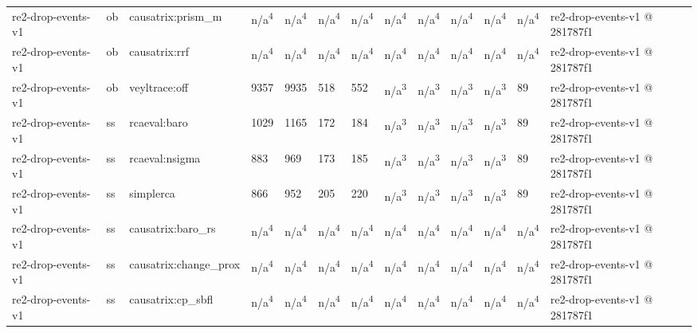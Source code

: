 \begin{table}[t]
\begin{tabular}{lllllllllllll}
re2-drop-events-v1 & ob & causatrix:prism\_m & n/a\textsuperscript{4} & n/a\textsuperscript{4} & n/a\textsuperscript{4} & n/a\textsuperscript{4} & n/a\textsuperscript{4} & n/a\textsuperscript{4} & n/a\textsuperscript{4} & n/a\textsuperscript{4} & n/a\textsuperscript{4} & re2-drop-events-v1 @ 281787f1 \\
re2-drop-events-v1 & ob & causatrix:rrf & n/a\textsuperscript{4} & n/a\textsuperscript{4} & n/a\textsuperscript{4} & n/a\textsuperscript{4} & n/a\textsuperscript{4} & n/a\textsuperscript{4} & n/a\textsuperscript{4} & n/a\textsuperscript{4} & n/a\textsuperscript{4} & re2-drop-events-v1 @ 281787f1 \\
re2-drop-events-v1 & ob & veyltrace:off & 9357 & 9935 & 518 & 552 & n/a\textsuperscript{3} & n/a\textsuperscript{3} & n/a\textsuperscript{3} & n/a\textsuperscript{3} & 89 & re2-drop-events-v1 @ 281787f1 \\
re2-drop-events-v1 & ss & rcaeval:baro & 1029 & 1165 & 172 & 184 & n/a\textsuperscript{3} & n/a\textsuperscript{3} & n/a\textsuperscript{3} & n/a\textsuperscript{3} & 89 & re2-drop-events-v1 @ 281787f1 \\
re2-drop-events-v1 & ss & rcaeval:nsigma & 883 & 969 & 173 & 185 & n/a\textsuperscript{3} & n/a\textsuperscript{3} & n/a\textsuperscript{3} & n/a\textsuperscript{3} & 89 & re2-drop-events-v1 @ 281787f1 \\
re2-drop-events-v1 & ss & simplerca & 866 & 952 & 205 & 220 & n/a\textsuperscript{3} & n/a\textsuperscript{3} & n/a\textsuperscript{3} & n/a\textsuperscript{3} & 89 & re2-drop-events-v1 @ 281787f1 \\
re2-drop-events-v1 & ss & causatrix:baro\_rs & n/a\textsuperscript{4} & n/a\textsuperscript{4} & n/a\textsuperscript{4} & n/a\textsuperscript{4} & n/a\textsuperscript{4} & n/a\textsuperscript{4} & n/a\textsuperscript{4} & n/a\textsuperscript{4} & n/a\textsuperscript{4} & re2-drop-events-v1 @ 281787f1 \\
re2-drop-events-v1 & ss & causatrix:change\_prox & n/a\textsuperscript{4} & n/a\textsuperscript{4} & n/a\textsuperscript{4} & n/a\textsuperscript{4} & n/a\textsuperscript{4} & n/a\textsuperscript{4} & n/a\textsuperscript{4} & n/a\textsuperscript{4} & n/a\textsuperscript{4} & re2-drop-events-v1 @ 281787f1 \\
re2-drop-events-v1 & ss & causatrix:cp\_sbfl & n/a\textsuperscript{4} & n/a\textsuperscript{4} & n/a\textsuperscript{4} & n/a\textsuperscript{4} & n/a\textsuperscript{4} & n/a\textsuperscript{4} & n/a\textsuperscript{4} & n/a\textsuperscript{4} & n/a\textsuperscript{4} & re2-drop-events-v1 @ 281787f1 \\

\end{tabular}
\end{table}
